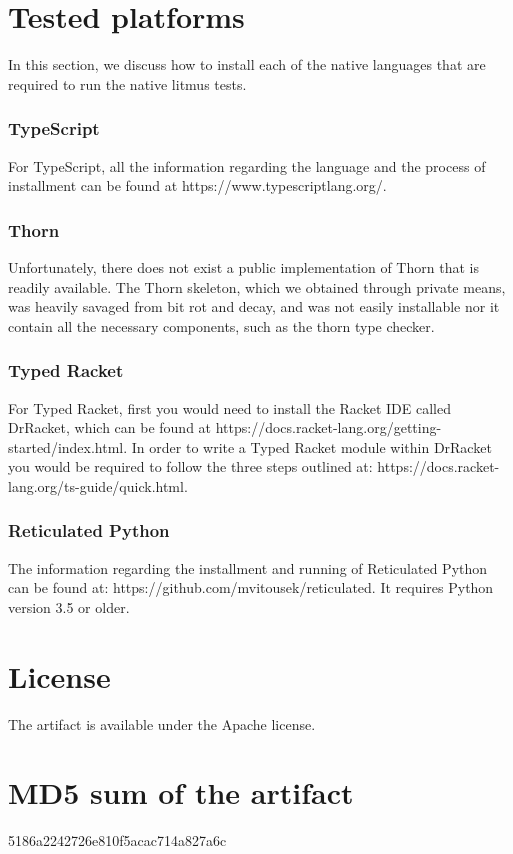 \documentclass[a4paper,UKenglish]{darts-v2018}
\newenvironment{platforms}{\section{Tested platforms}}{}
\newcommand{\license}[1]{{\section{License}#1}}
\newcommand{\mdsum}[1]{{\section{MD5 sum of the artifact}#1}}
\begin{document}
\begin{platforms}
In this section, we discuss how to install each of the native languages that are required to run the native litmus tests.

\subsubsection{TypeScript}

For TypeScript, all the information regarding the language and the process of installment can be found at https://www.typescriptlang.org/.

\subsubsection{Thorn}

Unfortunately, there does not exist a public implementation of Thorn that is readily available. The Thorn skeleton, which we obtained through private means, was heavily savaged from bit rot and decay, and was not easily installable nor it contain all the necessary components, such as the thorn type checker.

\subsubsection{Typed Racket}

For Typed Racket, first you would need to install the Racket IDE called DrRacket, which can be found at https://docs.racket-lang.org/getting-started/index.html. In order to write a Typed Racket module within DrRacket you would be required to follow the three steps outlined at: https://docs.racket-lang.org/ts-guide/quick.html.


\subsubsection{Reticulated Python}

The information regarding the installment and running of Reticulated Python can be found at: https://github.com/mvitousek/reticulated. It requires Python version 3.5 or older.
\end{platforms}

\license{The artifact is available under the Apache license.}

\mdsum{5186a2242726e810f5acac714a827a6c}
\end{document}
